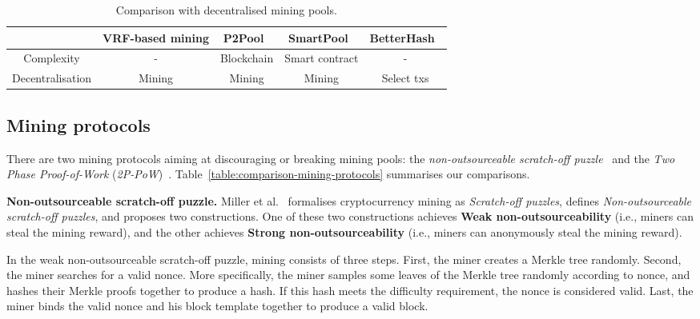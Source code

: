 \begin{table*}[]
    \quad

    \begin{subtable}[t]{\linewidth}
        \centering
        \caption{Comparison with decentralised mining pools.}
        \begin{tabular}{ccccc}
            \hline
                             & VRF-based mining & P2Pool~\cite{voight2011p2pool} & SmartPool~\cite{luu2017smartpool} & BetterHash~\cite{draft-bip-BetterHash} \\ \hline
            Complexity       & -                & Blockchain                     & Smart contract                    & -                                      \\
            Decentralisation & Mining           & Mining                         & Mining                            & Select txs                             \\ \hline
        \end{tabular}
        \label{table:comparison-pools}
    \end{subtable}

    \label{tab:comparisons}
\end{table*}


\subsection{Mining protocols}

There are two mining protocols aiming at discouraging or breaking mining pools: the \textit{non-outsourceable scratch-off puzzle}~\cite{miller2015nonoutsourceable} and the \textit{Two Phase Proof-of-Work} (\textit{2P-PoW})~\cite{2P-PoW}.
Table~\ref{table:comparison-mining-protocols} summarises our comparisons.

\textbf{Non-outsourceable scratch-off puzzle.}
Miller et al.~\cite{miller2015nonoutsourceable} formalises cryptocurrency mining as \textit{Scratch-off puzzles}, defines \textit{Non-outsourceable scratch-off puzzles}, and proposes two constructions.
One of these two constructions achieves \textbf{Weak non-outsourceability} (i.e., miners can steal the mining reward), and the other achieves \textbf{Strong non-outsourceability} (i.e., miners can anonymously steal the mining reward).

In the weak non-outsourceable scratch-off puzzle, mining consists of three steps.
First, the miner creates a Merkle tree randomly.
Second, the miner searches for a valid nonce.
More specifically, the miner samples some leaves of the Merkle tree randomly according to nonce, and hashes their Merkle proofs together to produce a hash.
If this hash meets the difficulty requirement, the nonce is considered valid.
Last, the miner binds the valid nonce and his block template together to produce a valid block.

